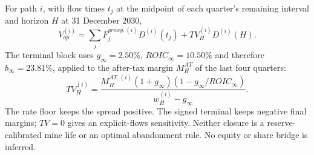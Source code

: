 For path $i$, with flow times $t_j$ at the midpoint of each quarter's remaining interval and horizon $H$ at 31 December 2030,
\begin{equation}
V_{op}^{(i)}=\sum_{j}F_j^{proxy,(i)}D^{(i)}(t_j)+TV_H^{(i)}D^{(i)}(H).
\label{eq:stochvalue}
\end{equation}
The terminal block uses $g_\infty=2.50\%$, $ROIC_\infty=10.50\%$ and therefore $b_\infty=23.81\%$, applied to the after-tax margin $M_H^{AT}$ of the last four quarters:
\begin{equation}
TV_H^{(i)}=\frac{M_H^{AT,(i)}(1+g_\infty)(1-g_\infty/ROIC_\infty)}{w_H^{(i)}-g_\infty}.
\label{eq:terminal_value}
\end{equation}
The rate floor keeps the spread positive. The signed terminal keeps negative final margins; $TV=0$ gives an explicit-flows sensitivity. Neither closure is a reserve-calibrated mine life or an optimal abandonment rule. No equity or share bridge is inferred.
